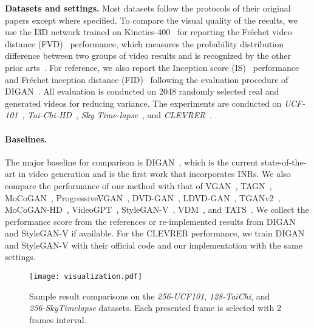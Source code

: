 \documentclass[letterpaper]{article}
\begin{document}
\textbf{Datasets and settings.}
Most datasets follow the protocols of their original papers except where specified.
To compare the visual quality of the results, we use the I3D network trained on Kinetics-400~\cite{kay2017kinetics} for reporting the Fr\'echet video distance (FVD)~\cite{unterthiner2018towards} performance, which measures the probability distribution difference between two groups of video results and is recognized by the other prior arts~\cite{yu2022generating, skorokhodov2021stylegan}.
For reference, we also report the Inception score (IS)~\cite{salimans2016improved} performance and Fr\'echet inception distance (FID)~\cite{heusel2017gans} following the evaluation procedure of DIGAN~\cite{yu2022generating}.
All evaluation is conducted on 2048 randomly selected real and generated videos for reducing variance. The experiments are conducted on \emph{UCF-101}~\cite{soomro2012ucf101}, \emph{Tai-Chi-HD}~\cite{siarohin2019first}, \emph{Sky Time-lapse}~\cite{xiong2018learning}, and \emph{CLEVRER}~\cite{yi2020clevrer}.

\paragraph{Baselines.}
The major baseline for comparison is DIGAN~\cite{yu2022generating}, which is the current state-of-the-art in video generation and is the first work that incorporates INRs.
We also compare the performance of our method with that of VGAN~\cite{vondrick2016generating}, TAGN~\cite{saito2017temporal}, MoCoGAN~\cite{tulyakov2018mocogan}, ProgressiveVGAN~\cite{acharya2018towards}, DVD-GAN~\cite{clark2019adversarial}, LDVD-GAN~\cite{kahembwe2020lower}, TGANv2~\cite{saito2020train}, MoCoGAN-HD~\cite{tian2021good}, VideoGPT~\cite{yan2021videogpt}, StyleGAN-V~\cite{skorokhodov2021stylegan}, VDM~\cite{ho2022video},  and TATS~\cite{ge2022long}.
We collect the performance score from the references or re-implemented results from DIGAN and StyleGAN-V if available.
For the CLEVRER performance, we train DIGAN and StyleGAN-V with their official code and our implementation with the same settings.



\begin{figure}[htbp]
  \centerline{\texttt{[image: visualization.pdf]}}
  \vspace{-.5\baselineskip}
  \caption{Sample result comparisons on the  \emph{256-UCF101}, \emph{128-TaiChi}, and \emph{256-SkyTimelapse} datasets. Each presented frame is selected with 2 frames interval.}
  \label{fig:mainr}
      \vspace{-1em}
\end{figure}
\end{document}
